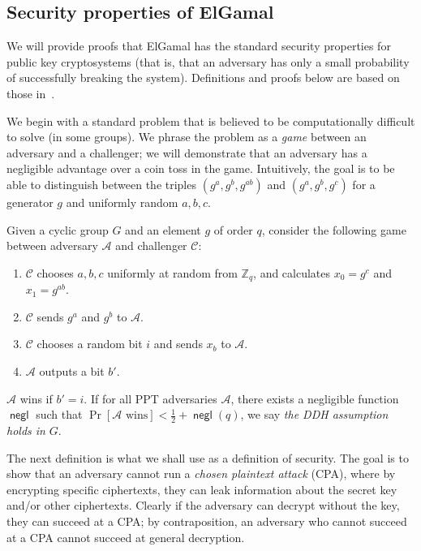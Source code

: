 \documentclass[11pt,twoside,a4paper]{article}
\DeclareMathOperator{\negl}{\mathsf{negl}}
\theoremstyle{definition}
\begin{document}
\subsection{Security properties of ElGamal}
We will provide proofs that ElGamal has the standard security properties for public key cryptosystems (that is, that an adversary has only a small probability of successfully breaking the system). Definitions and proofs below are based on those in~\cite{katz2014introduction}.

We begin with a standard problem that is believed to be computationally difficult to solve (in some groups). We phrase the problem as a \textit{game} between an adversary and a challenger; we will demonstrate that an adversary has a negligible advantage over a coin toss in the game. Intuitively, the goal is to be able to distinguish between the triples \((g^a, g^b, g^{ab})\) and \((g^a, g^b, g^c)\) for  a generator \(g\) and uniformly random \(a, b, c\).

\begin{definition}
    Given a cyclic group \(G\) and an element \(g\) of order \(q\), consider the following game between adversary \(\mathcal{A}\) and challenger \(\mathcal{C}\):
    \begin{enumerate}
        \item \(\mathcal{C}\) chooses \(a, b, c\) uniformly at random from \(\mathbb{Z}_q\), and calculates \(x_0=g^c\) and \(x_1=g^{ab}\).
        \item \(\mathcal{C}\) sends \(g^a\) and \(g^b\) to \(\mathcal{A}\).
        \item \(\mathcal{C}\) chooses a random bit \(i\) and sends \(x_b\) to \(\mathcal{A}\).
        \item \(\mathcal{A}\) outputs a bit \(b'\).
    \end{enumerate}
    \(\mathcal{A}\) wins if \(b' = i\). If for all PPT adversaries \(\mathcal{A}\), there exists a negligible function \(\negl\) such that \(\Pr[\mathcal{A}\text{ wins}]<\frac{1}{2}+\negl(q)\), we say \textit{the DDH assumption holds in} \(G\).
\end{definition}
The next definition is what we shall use as a definition of security. The goal is to show that an adversary cannot run a \textit{chosen plaintext attack} (CPA), where by encrypting specific ciphertexts, they can leak information about the secret key and/or other ciphertexts. Clearly if the adversary can decrypt without the key, they can succeed at a CPA; by contraposition, an adversary who cannot succeed at a CPA cannot succeed at general decryption.
\end{document}
